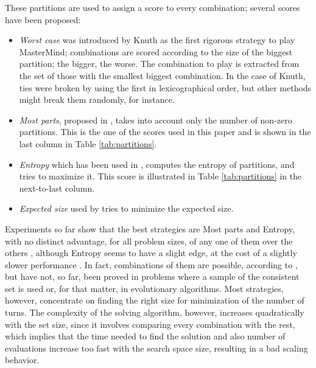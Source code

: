 \documentclass[conference]{IEEEtran}
\begin{document}
These partitions are used to assign a score to every combination;
several scores have been proposed:
\begin{itemize}
\item {\em Worst case} was introduced by Knuth \cite{Knuth} as the first rigorous strategy to play MasterMind; combinations are scored according to
  the size of the biggest partition; the bigger, the worse. The
  combination to play is extracted from the set of those with the
  smallest biggest combination. In the case of Knuth, ties were broken by using the first in
  lexicographical order, but other methods might break them randomly,
  for instance. 
\item {\em Most parts}, proposed in \cite{Kooi200513}, takes into
  account only the number of non-zero partitions. This is the one of
  the scores used in this paper and is shown in the last column in
  Table \ref{tab:partitions}.
\item {\em Entropy}  which has been used in \cite{Neuwirth,bestavros,mm:ppsn:2010}, computes
  the entropy of partitions, and tries to maximize it. This score is
  illustrated in Table \ref{tab:partitions} in the next-to-last column.
\item {\em Expected size} used by \cite{Berghman20091880,irving} tries to
  minimize the expected size.
\end{itemize}

Experiments so far show 
that the best strategies are Most parts and Entropy, with no distinct advantage, for all problem sizes, of any one of them over the others \cite{nicso}, although Entropy seems to have a slight edge, at the cost of a slightly slower performance \cite{mm:evostar13}. In fact, combinations of them are possible, according to \cite{DBLP:journals/corr/abs-1207-1315}, but have not, so far, been
proved in problems where a sample of the consistent set is used or, for that matter, in evolutionary algorithms. Most strategies, however, concentrate on finding the right size for minimization of the number of turns. The complexity of the solving algorithm, however, increases quadratically with the set size, since it involves comparing every combination with the rest, which
implies that the time needed to find the solution and also number of
evaluations increase too fast with the search space size, resulting in a bad
scaling behavior.
\end{document}
